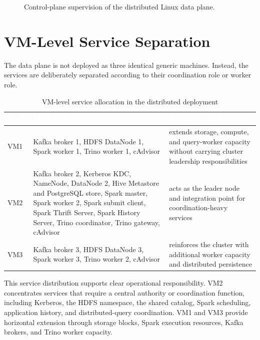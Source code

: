\begin{figure}[H]
    \centering
    
    \caption{Control-plane supervision of the distributed Linux data plane.}
    \label{fig:chapter6-control-vs-data-plane}
\end{figure}
\FloatBarrier

\section{VM-Level Service Separation}
The data plane is not deployed as three identical generic machines. Instead, the services are deliberately separated according to their coordination role or worker role.

\begin{table}[!htbp]
    \centering
    \footnotesize
    \renewcommand{\arraystretch}{1.16}
    \begin{tabularx}{\textwidth}{|L{1.4cm}|Y|Y|}
        \hline
        \textcolor{white}{\textbf{Node}} & \textcolor{white}{\textbf{Main hosted services}} & \textcolor{white}{\textbf{Architectural logic}} \\
        \hline
        VM1 & Kafka broker 1, HDFS DataNode 1, Spark worker 1, Trino worker 1, cAdvisor & extends storage, compute, and query-worker capacity without carrying cluster leadership responsibilities \\
        \hline
        VM2 & Kafka broker 2, Kerberos KDC, NameNode, DataNode 2, Hive Metastore and PostgreSQL store, Spark master, Spark worker 2, Spark submit client, Spark Thrift Server, Spark History Server, Trino coordinator, Trino gateway, cAdvisor & acts as the leader node and integration point for coordination-heavy services \\
        \hline
        VM3 & Kafka broker 3, HDFS DataNode 3, Spark worker 3, Trino worker 2, cAdvisor & reinforces the cluster with additional worker capacity and distributed persistence \\
        \hline
    \end{tabularx}
    \caption{VM-level service allocation in the distributed deployment}
    \label{tab:chapter6-vm-separation}
\end{table}

This service distribution supports clear operational responsibility. VM2 concentrates services that require a central authority or coordination function, including Kerberos, the HDFS namespace, the shared catalog, Spark scheduling, application history, and distributed-query coordination. VM1 and VM3 provide horizontal extension through storage blocks, Spark execution resources, Kafka brokers, and Trino worker capacity.

